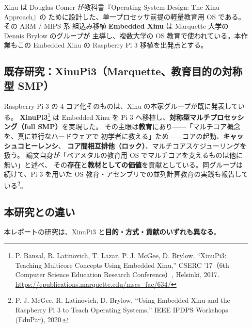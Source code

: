 
Xinu は Douglas Comer が教科書『Operating System Design: The Xinu Approach』の
ために設計した、単一プロセッサ前提の軽量教育用 OS である。その ARM / MIPS 系
組込み移植 \textbf{Embedded Xinu} は Marquette 大学の Dennis Brylow のグループが
主導し、複数大学の OS 教育で使われている。本作業もこの Embedded Xinu の
Raspberry Pi 3 移植を出発点とする。

\subsection{既存研究：XinuPi3（Marquette、教育目的の対称型 SMP）}

Raspberry Pi 3 の 4 コア化そのものは、Xinu の本家グループが既に発表している。
\textbf{XinuPi3}\footnote{P. Bansal, R. Latinovich, T. Lazar, P. J. McGee,
D. Brylow, ``XinuPi3: Teaching Multicore Concepts Using Embedded Xinu,''
CSERC '17（6th Computer Science Education Research Conference）, Helsinki, 2017.
\url{https://epublications.marquette.edu/mscs_fac/634/}} は Embedded Xinu を
Pi 3 へ移植し、\textbf{対称型マルチプロセッシング（full SMP）}を実現した。
その主眼は\textbf{教育}にあり——「マルチコア概念を、真に並行なハードウェアで
初学者に教える」ため——コアの起動、\textbf{キャッシュコヒーレンシ}、
\textbf{コア間相互排他（ロック）}、マルチコアスケジューリングを扱う。
論文自身が「ベアメタルの教育用 OS でマルチコアを支えるものは他に無い」と述べ、
その\textbf{存在}と\textbf{教材としての価値}を貢献としている。同グループは
続けて、Pi 3 を用いた OS 教育・アセンブリでの並列計算教育の実践も報告して
いる\footnote{P. J. McGee, R. Latinovich, D. Brylow, ``Using Embedded Xinu
and the Raspberry Pi 3 to Teach Operating Systems,'' IEEE IPDPS Workshops
(EduPar), 2020.}。

\subsection{本研究との違い}

本レポートの研究は、XinuPi3 と\textbf{目的・方式・貢献のいずれも異なる}。

